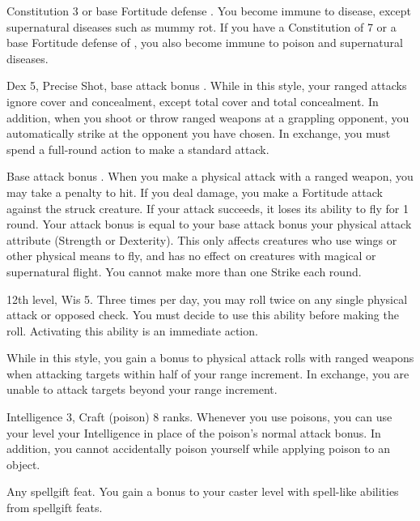 \featpre Constitution 3 or base Fortitude defense .
\featben You become immune to disease, except supernatural diseases such as mummy rot. If you have a Constitution of 7 or a base Fortitude defense of , you also become immune to poison and supernatural diseases.

 Dex 5, Precise Shot, base attack bonus .
 While in this style, your ranged attacks ignore cover and concealment, except total cover and total concealment. In addition, when you shoot or throw ranged weapons at a grappling opponent, you automatically strike at the opponent you have chosen. In exchange, you must spend a full-round action to make a standard attack.

\featpre Base attack bonus .
\featben When you make a physical attack with a ranged weapon, you may take a  penalty to hit. If you deal damage, you make a Fortitude attack against the struck creature. If your attack succeeds, it loses its ability to fly for 1 round. Your attack bonus is equal to your base attack bonus \add your physical attack attribute (Strength or Dexterity). This only affects creatures who use wings or other physical means to fly, and has no effect on creatures with magical or supernatural flight. You cannot make more than one Strike each round.

\featpre 12th level, Wis 5.
\featben Three times per day, you may roll twice on any single physical attack or opposed check. You must decide to use this ability before making the roll. Activating this ability is an immediate action.

 While in this style, you gain a  bonus to physical attack rolls with ranged weapons when attacking targets within half of your range increment. In exchange, you are unable to attack targets beyond your range increment.

\featpre Intelligence 3, Craft (poison) 8 ranks.
\featben Whenever you use poisons, you can use your level \add your Intelligence in place of the poison's normal attack bonus. In addition, you cannot accidentally poison yourself while applying poison to an object.

\featpre Any spellgift feat.
\featben You gain a  bonus to your caster level with spell-like abilities from spellgift feats.

